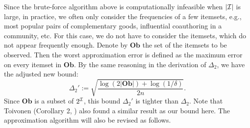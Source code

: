 \documentclass{article}
\begin{document}

Since the brute-force algorithm above is computationally infeasible when $|\mathcal{I}|$ is large, in practice, we often only consider the frequencies of a few itemsets, e.g., most popular pairs of complementary goods, influential coauthoring in a community, etc. For this case, we do not have to consider the itemsets, which do not appear frequently enough. 
\newcommand{\Ob}{\mathbf{Ob}}
Denote by $\Ob$ the set of the itemsets to be observed. Then the worst approximation error is defined as the maximum error on every itemset in $\Ob$. By the same reasoning in the derivation of $\Delta_2$, we have the adjusted new bound:
$$\Delta_2' := \sqrt{\frac{\log(2|\Ob|) + \log(1/\delta)}{2n}}.$$
Since $\Ob$ is a subset of $2^{\mathcal{I}}$, this bound $\Delta_2'$ is tighter than $\Delta_2$. Note that Toivonen (Corollary 2, \cite{Toi96}) also found a similar result as our bound here. The approximation algorithm will also be revised as follows.
\end{document}
